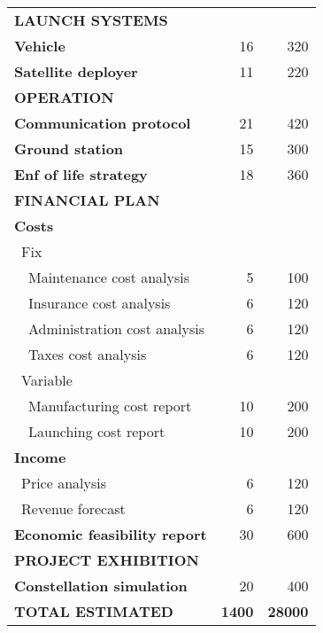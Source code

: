 \documentclass[11pt,a4paper]{article}
\begin{document}
\begin{longtable}{| l | r | r | }
\rowcolor[gray]{0.85} \textbf{LAUNCH SYSTEMS} &  &   \\
	
	\textbf{Vehicle} & 16 & 320 \\
	\hline
	\textbf{Satellite deployer} & 11  & 220 \\

\rowcolor[gray]{0.85} \textbf{OPERATION} &  &  \\
	
	\textbf{Communication protocol} & 21 & 420\\
	\hline
	\textbf{Ground station} & 15 & 300 \\
	\hline
	\textbf{Enf of life strategy} & 18  & 360 \\
	\hline

\pagebreak

	\hline
\rowcolor[gray]{0.85} \textbf{FINANCIAL PLAN} &  & \\
	
	\textbf{Costs} & & \\
	   \blue ~Fix &  &   \\
	   ~~Maintenance cost analysis & 5 & 100 \\
	   ~~Insurance cost analysis & 6 & 120 \\
	   ~~Administration cost analysis & 6 & 120 \\
	   ~~Taxes cost analysis & 6 & 120 \\
	   \blue ~Variable &  &  \\
	   ~~Manufacturing cost report & 10 & 200 \\
	   ~~Launching cost report & 10 & 200 \\
	\hline
	\textbf{Income} &   &  \\
	   \blue ~Price analysis & 6  & 120  \\
	   \blue ~Revenue forecast & 6  & 120  \\
	\hline
	\textbf{Economic feasibility report} & 30 & 600 \\

\rowcolor[gray]{0.85} \textbf{PROJECT EXHIBITION} & &  \\

	\textbf{Constellation simulation} & 20 & 400 \\


\rowcolor[gray]{0.65} \textbf{TOTAL ESTIMATED} & \textbf{1400} & \textbf{28000} \\
       \hline

\end{longtable}
\end{document}
